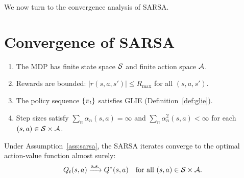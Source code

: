 \documentclass[11pt,a4paper]{article}
\begin{document}
We now turn to the convergence analysis of SARSA.

\section{Convergence of SARSA}
\label{sec:convergence}

\begin{assumption}
\label{ass:sarsa}
\begin{enumerate}[nosep]
  \item The MDP has finite state space $\mathcal{S}$ and finite action
    space $\mathcal{A}$.
  \item Rewards are bounded: $|r(s,a,s')| \leq R_{\max}$ for all
    $(s,a,s')$.
  \item The policy sequence $\{\pi_t\}$ satisfies GLIE
    (Definition~\ref{def:glie}).
  \item Step sizes satisfy $\sum_n \alpha_n(s,a) = \infty$ and
    $\sum_n \alpha_n^2(s,a) < \infty$ for each
    $(s,a) \in \mathcal{S} \times \mathcal{A}$.
\end{enumerate}
\end{assumption}

\begin{keyresult}[title={Convergence of SARSA (Singh et al.\ 2000)}]
\begin{theorem}
\label{thm:sarsa}
Under Assumption~\ref{ass:sarsa}, the SARSA iterates converge to the
optimal action-value function almost surely:
\begin{equation}
  Q_t(s,a) \xrightarrow{\text{a.s.}} Q^*(s,a)
  \quad \text{for all } (s,a) \in \mathcal{S} \times \mathcal{A}.
  \label{eq:sarsa_convergence}
\end{equation}
\end{theorem}
\end{keyresult}
\end{document}
